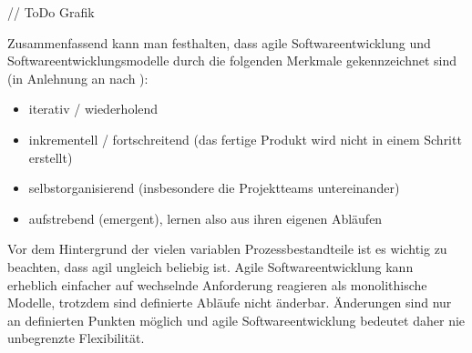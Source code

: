 // ToDo Grafik

Zusammenfassend kann man festhalten, dass agile Softwareentwicklung und Softwareentwicklungsmodelle durch die folgenden Merkmale gekennzeichnet sind (in Anlehnung an \cite{moniruzzaman2013comparative} nach \cite{goos_extreme_2002}):
\begin{itemize}
    \item iterativ / wiederholend
    \item inkrementell / fortschreitend (das fertige Produkt wird nicht in einem Schritt erstellt)
    \item selbstorganisierend (insbesondere die Projektteams untereinander)
    \item aufstrebend (\glqq{}emergent\grqq{}), lernen also aus ihren eigenen Abläufen
\end{itemize}
Vor dem Hintergrund der vielen variablen Prozessbestandteile ist es wichtig zu beachten, dass agil ungleich beliebig ist.
Agile Softwareentwicklung kann erheblich einfacher auf wechselnde Anforderung reagieren als monolithische Modelle, trotzdem sind definierte Abläufe nicht änderbar. Änderungen sind nur an definierten Punkten möglich und agile Softwareentwicklung bedeutet daher nie unbegrenzte Flexibilität. 